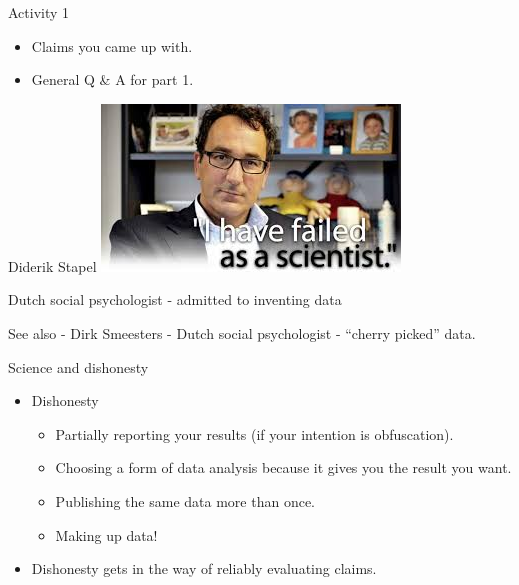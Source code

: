 \documentclass{beamer}
\begin{document}
\begin{frame}{Activity 1}
  \begin{itemize}
  \item Claims you came up with.
  \item General Q \& A for part 1.
  \end{itemize}
\end{frame}

\begin{frame}{Diderik Stapel}
	\includegraphics[width=.9\textwidth]{pics/stapel.jpg}

	Dutch social psychologist - admitted to inventing data
	
	See also - Dirk Smeesters - Dutch social psychologist - ``cherry picked'' data.
	
\end{frame}

\begin{frame}{Science and dishonesty}
	\begin{itemize}
		\item Dishonesty
		\begin{itemize}
			\item Partially reporting your results (if your intention is obfuscation). 
			\item Choosing a form of data analysis because it gives you the result you want.
			\item Publishing the same data more than once.
			\item Making up data!
		\end{itemize}
		\item Dishonesty gets in the way of reliably evaluating claims.
	\end{itemize}
\end{frame}
\end{document}
